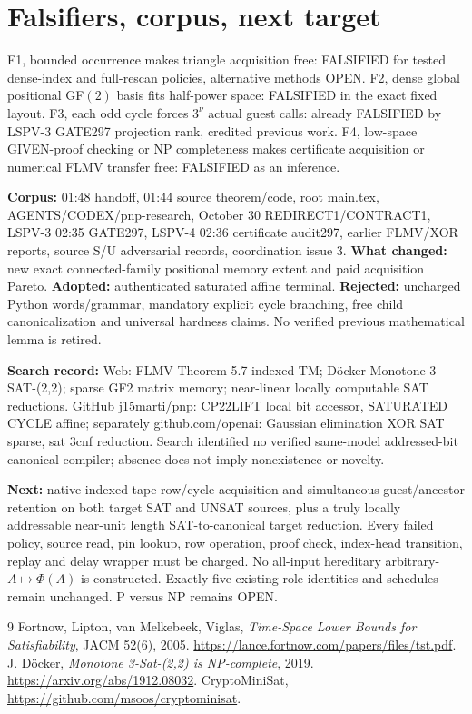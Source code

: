 \documentclass[11pt]{article}
\begin{document}
\section{Falsifiers, corpus, next target}
\noindent F1, bounded occurrence makes triangle acquisition free: FALSIFIED for tested dense-index and full-rescan policies, alternative methods OPEN. F2, dense global positional GF$(2)$ basis fits half-power space: FALSIFIED in the exact fixed layout. F3, each odd cycle forces $3^\nu$ actual guest calls: already FALSIFIED by LSPV-3 GATE297 projection rank, credited previous work. F4, low-space GIVEN-proof checking or NP completeness makes certificate acquisition or numerical FLMV transfer free: FALSIFIED as an inference.

\noindent\textbf{Corpus:} 01:48 handoff, 01:44 source theorem/code, root main.tex, AGENTS/CODEX/pnp-research, October 30 REDIRECT1/CONTRACT1, LSPV-3 02:35 GATE297, LSPV-4 02:36 certificate audit297, earlier FLMV/XOR reports, source S/U adversarial records, coordination issue 3. \textbf{What changed:} new exact connected-family positional memory extent and paid acquisition Pareto. \textbf{Adopted:} authenticated saturated affine terminal. \textbf{Rejected:} uncharged Python words/grammar, mandatory explicit cycle branching, free child canonicalization and universal hardness claims. No verified previous mathematical lemma is retired.

\noindent\textbf{Search record:} Web: FLMV Theorem 5.7 indexed TM; D\"ocker Monotone 3-SAT-(2,2); sparse GF2 matrix memory; near-linear locally computable SAT reductions. GitHub j15marti/pnp: CP22LIFT local bit accessor, SATURATED CYCLE affine; separately github.com/openai: Gaussian elimination XOR SAT sparse, sat 3cnf reduction. Search identified no verified same-model addressed-bit canonical compiler; absence does not imply nonexistence or novelty.

\noindent\textbf{Next:} native indexed-tape row/cycle acquisition and simultaneous guest/ancestor retention on both target SAT and UNSAT sources, plus a truly locally addressable near-unit length SAT-to-canonical target reduction. Every failed policy, source read, pin lookup, row operation, proof check, index-head transition, replay and delay wrapper must be charged. No all-input hereditary arbitrary-$A\mapsto\Phi(A)$ is constructed. Exactly five existing role identities and schedules remain unchanged. P versus NP remains OPEN.
\begin{thebibliography}{9}
 Fortnow, Lipton, van Melkebeek, Viglas, \emph{Time-Space Lower Bounds for Satisfiability}, JACM 52(6), 2005. \url{https://lance.fortnow.com/papers/files/tst.pdf}.
 J. D\"ocker, \emph{Monotone 3-Sat-(2,2) is NP-complete}, 2019. \url{https://arxiv.org/abs/1912.08032}.
 CryptoMiniSat, \url{https://github.com/msoos/cryptominisat}.
\end{thebibliography}
\end{document}
